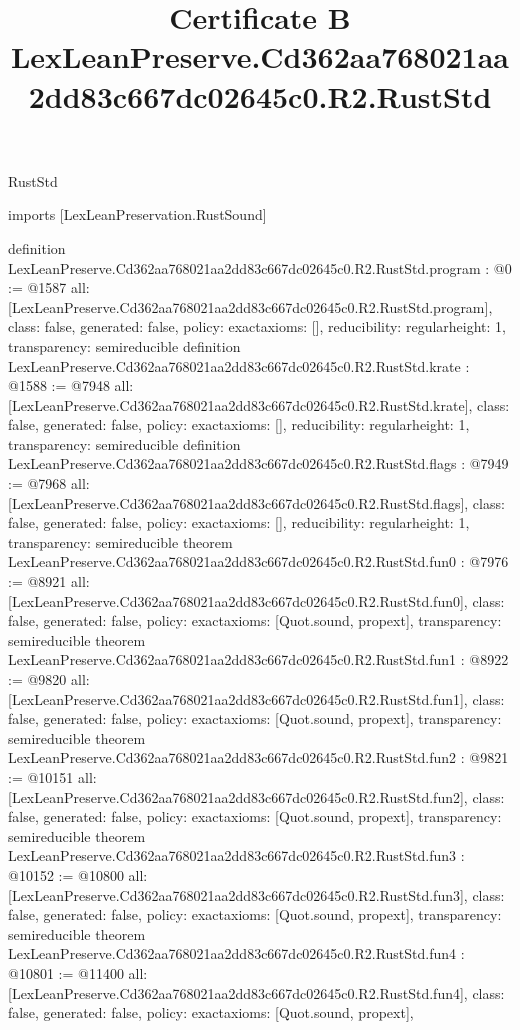 \begin{lexlean}{RustStd}
\title{Certificate B LexLeanPreserve.Cd362aa768021aa2dd83c667dc02645c0.R2.RustStd}
\begin{coremodule}
imports [LexLeanPreservation.RustSound]

definition LexLeanPreserve.Cd362aa768021aa2dd83c667dc02645c0.R2.RustStd.program : @0 := @1587 {
  all: [LexLeanPreserve.Cd362aa768021aa2dd83c667dc02645c0.R2.RustStd.program],
  class: false,
  generated: false,
  policy: exact{axioms: []},
  reducibility: regular{height: 1},
  transparency: semireducible
}
definition LexLeanPreserve.Cd362aa768021aa2dd83c667dc02645c0.R2.RustStd.krate : @1588 := @7948 {
  all: [LexLeanPreserve.Cd362aa768021aa2dd83c667dc02645c0.R2.RustStd.krate],
  class: false,
  generated: false,
  policy: exact{axioms: []},
  reducibility: regular{height: 1},
  transparency: semireducible
}
definition LexLeanPreserve.Cd362aa768021aa2dd83c667dc02645c0.R2.RustStd.flags : @7949 := @7968 {
  all: [LexLeanPreserve.Cd362aa768021aa2dd83c667dc02645c0.R2.RustStd.flags],
  class: false,
  generated: false,
  policy: exact{axioms: []},
  reducibility: regular{height: 1},
  transparency: semireducible
}
theorem LexLeanPreserve.Cd362aa768021aa2dd83c667dc02645c0.R2.RustStd.fun0 : @7976 := @8921 {
  all: [LexLeanPreserve.Cd362aa768021aa2dd83c667dc02645c0.R2.RustStd.fun0],
  class: false,
  generated: false,
  policy: exact{axioms: [Quot.sound, propext]},
  transparency: semireducible
}
theorem LexLeanPreserve.Cd362aa768021aa2dd83c667dc02645c0.R2.RustStd.fun1 : @8922 := @9820 {
  all: [LexLeanPreserve.Cd362aa768021aa2dd83c667dc02645c0.R2.RustStd.fun1],
  class: false,
  generated: false,
  policy: exact{axioms: [Quot.sound, propext]},
  transparency: semireducible
}
theorem LexLeanPreserve.Cd362aa768021aa2dd83c667dc02645c0.R2.RustStd.fun2 : @9821 := @10151 {
  all: [LexLeanPreserve.Cd362aa768021aa2dd83c667dc02645c0.R2.RustStd.fun2],
  class: false,
  generated: false,
  policy: exact{axioms: [Quot.sound, propext]},
  transparency: semireducible
}
theorem LexLeanPreserve.Cd362aa768021aa2dd83c667dc02645c0.R2.RustStd.fun3 : @10152 := @10800 {
  all: [LexLeanPreserve.Cd362aa768021aa2dd83c667dc02645c0.R2.RustStd.fun3],
  class: false,
  generated: false,
  policy: exact{axioms: [Quot.sound, propext]},
  transparency: semireducible
}
theorem LexLeanPreserve.Cd362aa768021aa2dd83c667dc02645c0.R2.RustStd.fun4 : @10801 := @11400 {
  all: [LexLeanPreserve.Cd362aa768021aa2dd83c667dc02645c0.R2.RustStd.fun4],
  class: false,
  generated: false,
  policy: exact{axioms: [Quot.sound, propext]},
}
\end{coremodule}
\end{lexlean}
